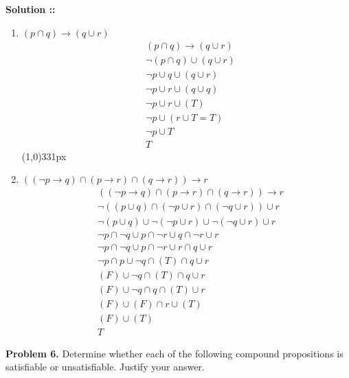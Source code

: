 \documentclass[11pt]{article}
\begin{document}
\vspace{5px}\textbf{Solution ::}
\begin{enumerate}[label=5.\arabic* ::]
\item 
$(p\cap q)\rightarrow(q\cup r)$
\begin{align}
    &(p\cap q)\rightarrow(q\cup r) \\
    &\neg(p\cap q)\cup(q\cup r) \\
    &\neg p\cup q\cup(q\cup r) \\
    &\neg p\cup r\cup(q\cup q) \\
    &\neg p\cup r\cup (T) \\
    &\neg p\cup(r\cup T = T) \\
    &\neg p\cup T \\
    &T
\end{align}
\line(1,0){331px}

\item
$((\neg p\rightarrow q)\cap(p\rightarrow r)\cap (q\rightarrow r))\rightarrow r$
\begin{align}
    &((\neg p\rightarrow q)\cap(p\rightarrow r)\cap (q\rightarrow r))\rightarrow r \\
    &\neg((p\cup q)\cap(\neg p\cup r)\cap(\neg q\cup r))\cup r \\
    &\neg(p\cup q)\cup\neg(\neg p\cup r)\cup\neg(\neg q\cup r)\cup r \\
    &\neg p\cap\neg q\cup p\cap\neg r\cup q\cap\neg r\cup r \\
    &\neg p\cap\neg q\cup p\cap\neg r\cup r\cap q\cup r \\
    &\neg p\cap p\cup\neg q\cap(T)\cap q\cup r \\
    &(F)\cup\neg q\cap(T)\cap q\cup r \\
    &(F)\cup\neg q\cap q\cap(T)\cup r \\
    &(F)\cup(F)\cap r\cup(T) \\
    &(F)\cup(T) \\
    &T
\end{align}
\end{enumerate}
\pagebreak


\textbf{Problem 6.} Determine whether each of the following compound propositions is
satisfiable or unsatisfiable. Justify your answer.
\end{document}
